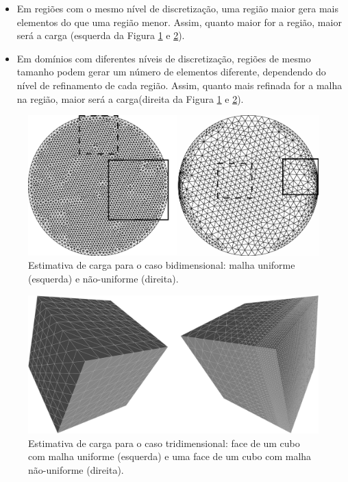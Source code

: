 \begin{itemize}
	\item Em regiões com o mesmo nível de discretização, uma região maior gera mais elementos do que uma região menor. Assim, quanto maior for a região, maior será a carga (esquerda da Figura \ref{fig:malha_uniforme_não_uniforme} e \ref{fig:malha_uniforme_não_uniforme_trid}).
	\item Em domínios com diferentes níveis de discretização, regiões de mesmo tamanho podem gerar um número de elementos diferente, dependendo do nível de refinamento de cada região. Assim, quanto mais refinada for a malha na região, maior será a carga(direita da Figura \ref{fig:malha_uniforme_não_uniforme} e \ref{fig:malha_uniforme_não_uniforme_trid}).
\end{itemize}


\begin{figure}[!ht]
	\centering
	\includegraphics[width=1.0\textwidth]{fig/meshes_transition_and_uniform.png}
	\caption{Estimativa de carga para o caso bidimensional: malha uniforme (esquerda) e não-uniforme (direita).}
	\label{fig:malha_uniforme_não_uniforme}
\end{figure}

\begin{figure}[!ht]
	\centering
	\includegraphics[width=1.0\textwidth]{fig/cubes_comp_uniform.png}
	\caption{Estimativa de carga para o caso tridimensional: face de um cubo com malha uniforme (esquerda) e uma face de um cubo com malha não-uniforme (direita).}
	\label{fig:malha_uniforme_não_uniforme_trid}
\end{figure}

